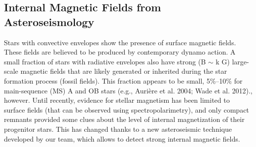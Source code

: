 {\color{red}\subsection{Internal Magnetic Fields from Asteroseismology}}
Stars with convective envelopes show the presence of
surface magnetic fields. These fields are believed to be produced by contemporary dynamo action.
A small fraction of stars with radiative envelopes also have strong (B $\sim$ k G)
large-scale magnetic fields that are likely generated or inherited during the star
formation process (fossil fields). This fraction appears to be small, 5\%–10\% for main-sequence (MS) A and OB stars (e.g., Aurière et al. 2004; Wade et al. 2012)., however.
Until recently, evidence for stellar magnetism has been limited to surface fields (that can be observed using spectropolarimetry),
and only compact remnants provided some clues about the level of internal magnetization of their progenitor stars.
This has changed thanks to a new asteroseismic technique developed by our team, which allows to detect strong internal magnetic fields.